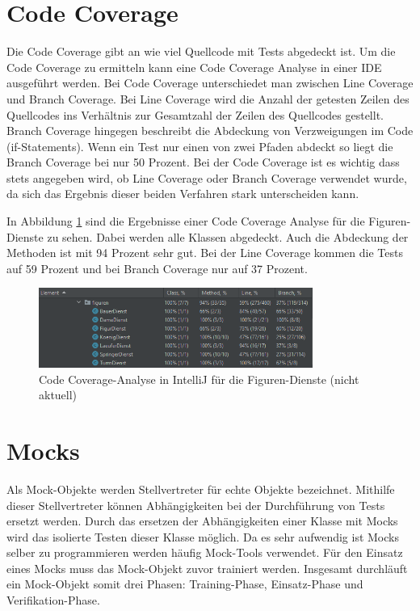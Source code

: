 \section{Code Coverage}
Die Code Coverage gibt an wie viel Quellcode mit Tests abgedeckt ist. Um die Code Coverage zu ermitteln kann eine Code Coverage Analyse in einer IDE ausgeführt werden. Bei Code Coverage unterschiedet man zwischen Line Coverage und Branch Coverage. Bei Line Coverage wird die Anzahl der getesten Zeilen des Quellcodes ins Verhältnis zur Gesamtzahl der Zeilen des Quellcodes gestellt. Branch Coverage hingegen beschreibt die Abdeckung von Verzweigungen im Code (if-Statements). Wenn ein Test nur einen von zwei Pfaden abdeckt so liegt die Branch Coverage bei nur 50 Prozent. Bei der Code Coverage ist es wichtig dass stets angegeben wird, ob Line Coverage oder Branch Coverage verwendet wurde, da sich das Ergebnis dieser beiden Verfahren stark unterscheiden kann.

In Abbildung \ref{fig:CodeCoverage} sind die Ergebnisse einer Code Coverage Analyse für die Figuren-Dienste zu sehen. Dabei werden alle Klassen abgedeckt. Auch die Abdeckung der Methoden ist mit 94 Prozent sehr gut. Bei der Line Coverage kommen die Tests auf 59 Prozent und bei Branch Coverage nur auf 37 Prozent.
\begin{figure}[ht]
	\centering
	\includegraphics[width=0.8\textwidth]{Bilder/CodeCoverage.png} 
	\caption{Code Coverage-Analyse in IntelliJ für die Figuren-Dienste (nicht aktuell)}
	\label{fig:CodeCoverage}
\end{figure}


\section{Mocks}
Als Mock-Objekte werden Stellvertreter für echte Objekte bezeichnet. Mithilfe dieser Stellvertreter können Abhängigkeiten bei der Durchführung von Tests ersetzt werden. Durch das ersetzen der Abhängigkeiten einer Klasse mit Mocks wird das isolierte Testen dieser Klasse möglich. Da es sehr aufwendig ist Mocks selber zu programmieren werden häufig Mock-Tools verwendet. Für den Einsatz eines Mocks muss das Mock-Objekt zuvor trainiert werden. Insgesamt durchläuft ein Mock-Objekt somit drei Phasen: Training-Phase, Einsatz-Phase und Verifikation-Phase. 

